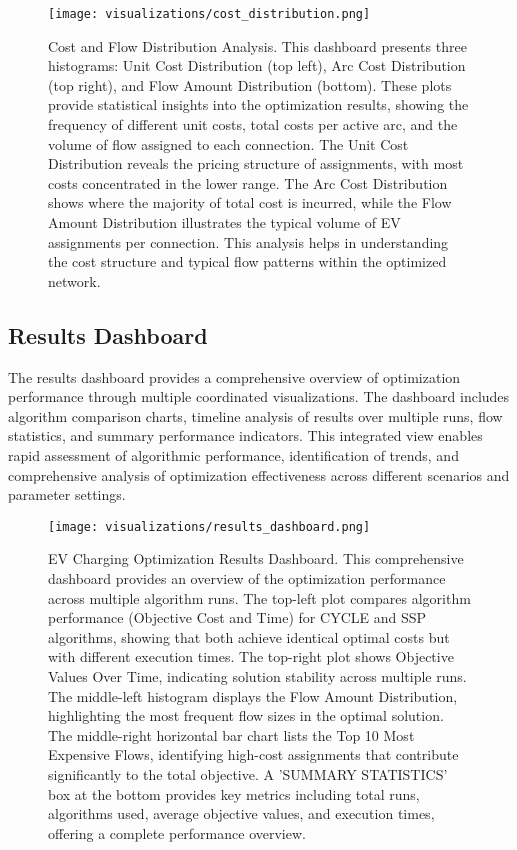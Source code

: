 \documentclass[12pt,a4paper]{article}
\begin{document}
\begin{figure}[H]
    \centering
    \texttt{[image: visualizations/cost\_distribution.png]}
    \caption{Cost and Flow Distribution Analysis. This dashboard presents three histograms: Unit Cost Distribution (top left), Arc Cost Distribution (top right), and Flow Amount Distribution (bottom). These plots provide statistical insights into the optimization results, showing the frequency of different unit costs, total costs per active arc, and the volume of flow assigned to each connection. The Unit Cost Distribution reveals the pricing structure of assignments, with most costs concentrated in the lower range. The Arc Cost Distribution shows where the majority of total cost is incurred, while the Flow Amount Distribution illustrates the typical volume of EV assignments per connection. This analysis helps in understanding the cost structure and typical flow patterns within the optimized network.}
    \label{fig:cost_distribution_analysis}
\end{figure}

\subsection{Results Dashboard}

The results dashboard provides a comprehensive overview of optimization performance through multiple coordinated visualizations. The dashboard includes algorithm comparison charts, timeline analysis of results over multiple runs, flow statistics, and summary performance indicators. This integrated view enables rapid assessment of algorithmic performance, identification of trends, and comprehensive analysis of optimization effectiveness across different scenarios and parameter settings.

\begin{figure}[H]
    \centering
    \texttt{[image: visualizations/results\_dashboard.png]}
    \caption{EV Charging Optimization Results Dashboard. This comprehensive dashboard provides an overview of the optimization performance across multiple algorithm runs. The top-left plot compares algorithm performance (Objective Cost and Time) for CYCLE and SSP algorithms, showing that both achieve identical optimal costs but with different execution times. The top-right plot shows Objective Values Over Time, indicating solution stability across multiple runs. The middle-left histogram displays the Flow Amount Distribution, highlighting the most frequent flow sizes in the optimal solution. The middle-right horizontal bar chart lists the Top 10 Most Expensive Flows, identifying high-cost assignments that contribute significantly to the total objective. A 'SUMMARY STATISTICS' box at the bottom provides key metrics including total runs, algorithms used, average objective values, and execution times, offering a complete performance overview.}
    \label{fig:results_dashboard}
\end{figure}
\end{document}
